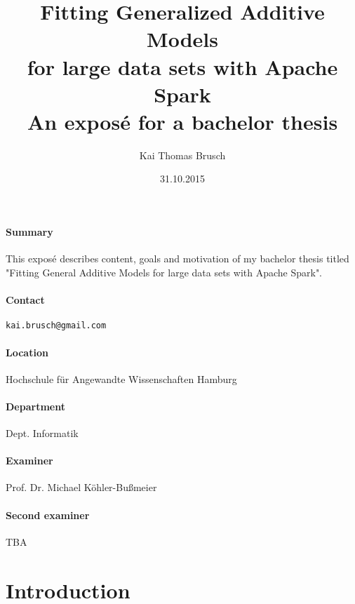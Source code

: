\documentclass{article}
\title{
    Fitting Generalized Additive Models\\ for large data sets with Apache Spark \\[7pt]
    \large An exposé for a bachelor thesis
}
\date{31.10.2015}
\author{Kai Thomas Brusch}
\begin{document}

    \maketitle

    \paragraph{Summary}

    This exposé describes content, goals and motivation of my bachelor thesis titled "Fitting General Additive Models for large data sets with Apache Spark".

    \paragraph{Contact} \texttt{kai.brusch@gmail.com}

    \paragraph{Location} Hochschule für Angewandte Wissenschaften Hamburg
    \paragraph{Department} Dept. Informatik
    \paragraph{Examiner} Prof. Dr. Michael Köhler-Bußmeier
    \paragraph{Second examiner} TBA

    \newpage

    \tableofcontents

    \newpage

    \section{Introduction}
\end{document}
